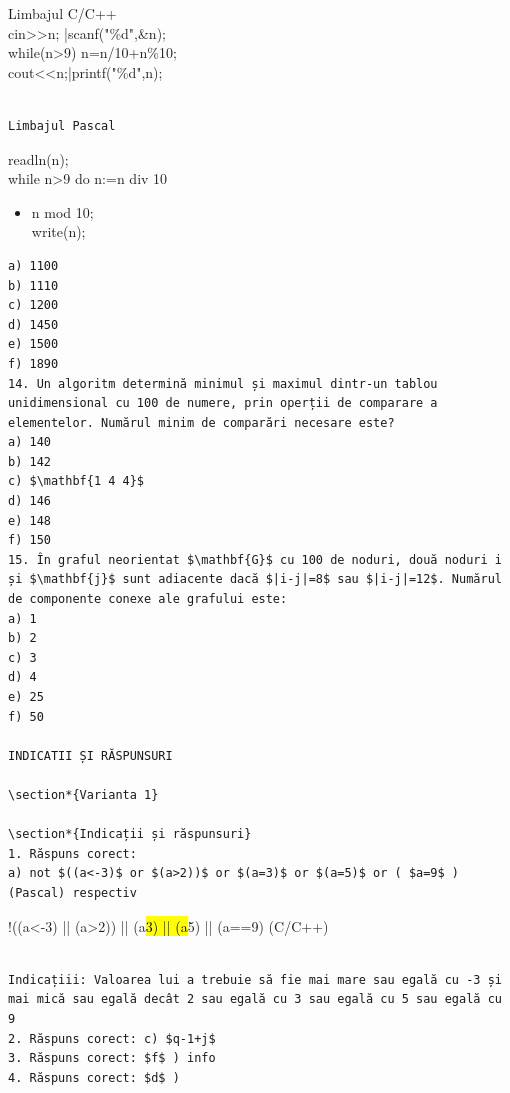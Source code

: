 \documentclass[10pt]{article}
\begin{document}
Limbajul C/C++\\
cin>>n; |scanf("\%d",\&n);\\
while(n>9) n=n/10+n\%10;\\
cout<<n;|printf("\%d",n);

\begin{verbatim}

Limbajul Pascal
\end{verbatim}

readln(n);\\
while n>9 do n:=n div 10

\begin{itemize}
  \item n mod 10;\\
write(n);
\end{itemize}

\begin{verbatim}
a) 1100
b) 1110
c) 1200
d) 1450
e) 1500
f) 1890
14. Un algoritm determină minimul și maximul dintr-un tablou unidimensional cu 100 de numere, prin operții de comparare a elementelor. Numărul minim de comparări necesare este?
a) 140
b) 142
c) $\mathbf{1 4 4}$
d) 146
e) 148
f) 150
15. În graful neorientat $\mathbf{G}$ cu 100 de noduri, două noduri i și $\mathbf{j}$ sunt adiacente dacă $|i-j|=8$ sau $|i-j|=12$. Numărul de componente conexe ale grafului este:
a) 1
b) 2
c) 3
d) 4
e) 25
f) 50

INDICATII ȘI RĂSPUNSURI

\section*{Varianta 1}

\section*{Indicații și răspunsuri}
1. Răspuns corect:
a) not $((a<-3)$ or $(a>2))$ or $(a=3)$ or $(a=5)$ or ( $a=9$ ) (Pascal) respectiv
\end{verbatim}

!((a<-3) || (a>2)) || (a\hl{3) || (a}5) || (a==9) (C/C++)

\begin{verbatim}

Indicațiii: Valoarea lui a trebuie să fie mai mare sau egală cu -3 și mai mică sau egală decât 2 sau egală cu 3 sau egală cu 5 sau egală cu 9
2. Răspuns corect: c) $q-1+j$
3. Răspuns corect: $f$ ) info
4. Răspuns corect: $d$ )
\end{verbatim}
\end{document}

